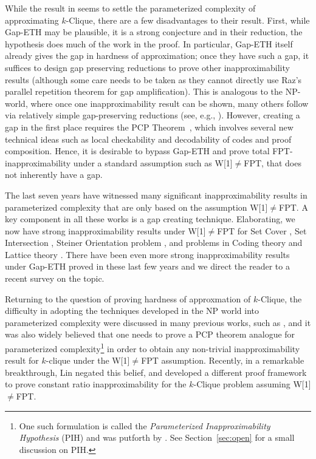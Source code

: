 \documentclass[11pt]{article}
\begin{document}
While the result in \cite{CCKLMNT20}  seems to settle the parameterized complexity of approximating $k$-Clique, there are a few disadvantages to their result. First, while Gap-ETH may be plausible, it is a strong conjecture and in their reduction, the hypothesis does much of the work in the proof. In particular, Gap-ETH itself already gives the gap in hardness of approximation; once they have  such a gap, it suffices to design gap preserving reductions to prove other inapproximability results (although some care needs to be taken as they cannot directly use Raz's parallel repetition theorem \cite{R98} for gap amplification). This is analogous to the NP-world, where once one inapproximability result can be shown, many others follow via relatively simple gap-preserving reductions (see, e.g., \cite{PY91}). However, creating a gap in the first place requires the PCP Theorem~\cite{AS98,ALMSS98,D07}, which involves several new technical ideas such as local checkability and decodability of codes and proof composition. Hence, it is desirable to bypass Gap-ETH and prove total FPT-inapproximability under a standard assumption such as W[1]$\neq$FPT, that does not inherently have a gap.

The last seven years have witnessed many significant inapproximability results in parameterized complexity that are only based on the assumption  W[1]$\neq$FPT. A key component in all these works is a gap creating technique. Elaborating, we now have strong inapproximability results under W[1]$\neq$FPT for 
Set Cover \cite{CL19,KLM19,L19,KN21}, Set Intersection \cite{L18,BKN21},
Steiner Orientation problem \cite{W20}, and problems in Coding theory and Lattice theory \cite{BBEGKLMM21}. There have been even more   strong inapproximability results under Gap-ETH proved in these last few years and we direct the reader to a recent survey \cite{FKLM20} on the topic. 











Returning to the question of proving hardness of approxmation of $k$-Clique, the difficulty in adopting the  techniques developed in the NP world into parameterized complexity 	were discussed in many previous works, such as \cite{CGG06,L18,CL19, FKLM20}, and it was also widely believed \cite{CGG06} that one needs to prove a PCP theorem analogue for parameterized complexity\footnote{One such formulation is called the \emph{Parameterized Inapproximability Hypothesis} (PIH) and was putforth by \cite{LRSZ20}. See Section~\ref{sec:open} for a small discussion on PIH. } in order to obtain any non-trivial inapproximability result for $k$-clique under the W[1]$\neq$FPT assumption. Recently, in a remarkable breakthrough, Lin \cite{L21} negated this belief, and developed a different proof framework to prove constant ratio inapproximability for the $k$-Clique problem assuming W[1]$\neq$FPT. 
\end{document}

